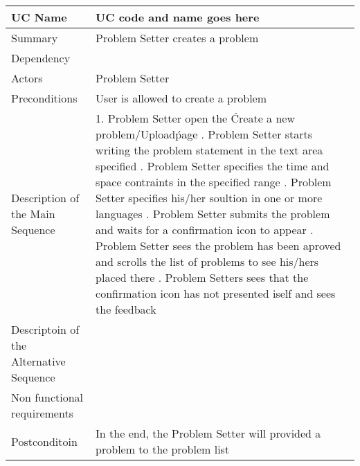 \begin{table}[htbp]
\centering
\begin{tabularx}{\textwidth}{|l|X|}
\hline
UC Name & UC code and name goes here \\ \hline

Summary &  Problem Setter creates a problem \\ \hline

Dependency & \- \\ \hline

Actors & Problem Setter \\ \hline

Preconditions & User is allowed to create a problem \\ \hline

Description of the Main Sequence & 1.	Problem Setter open the \'Create a new problem/Upload\' page  \newline  2. Problem Setter starts writing the problem statement in the text area specified \newline 3.  Problem Setter specifies the time and space contraints in the specified range \newline 4. Problem Setter specifies his/her soultion in one or more languages \newline 5. Problem Setter submits the problem and waits for a confirmation icon to appear \newline 6. Problem Setter sees the problem has been aproved and scrolls the list of problems to see his/hers placed there \newline 7. Problem Setters sees that the confirmation icon has not presented iself and sees the feedback \\ \hline

Descriptoin of the Alternative Sequence & \- \\ \hline

Non functional requirements & \- \\ \hline

Postconditoin & In the end, the Problem Setter will provided a problem to the problem list \\ \hline

\end{tabularx}
\end{table}

